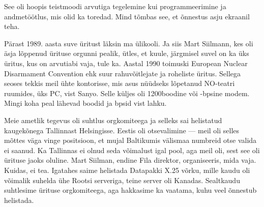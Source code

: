 
See oli hoopis teistmoodi arvutiga 
tegelemine kui programmeerimine ja andmetöötlus, mis olid ka toredad. 
Mind tõmbas see, et õnnestus asju ekraanil teha. 

Pärast 1989. aasta suve üritust läksin ma ülikooli. Ja siis 
Mart Siilmann, kes oli äsja lõppenud ürituse orgunni 
pealik, ütles, et kuule, järgmisel suvel on ka üks üritus, kus on 
arvutiabi vaja, tule ka. Aastal 1990 toimuski European Nuclear Disarmament Convention ehk suur rahuvõitlejate ja roheliste üritus. 
Sellega seoses tekkis meil ühte kontorisse, mis asus nüüdseks 
lõpetanud NO-teatri ruumides, üks PC, vist Sanyo. Selle küljes oli 1200boodine või -bpsine 
modem. Mingi koha peal lähevad boodid ja bpsid vist lahku. 

Meie ametlik tegevus oli suhtlus orgkomiteega ja selleks 
sai helistatud kaugekõnega Tallinnast Helsingisse. Eestis oli otsevalimine --- 
meil oli selles mõttes väga vinge positsioon, et mujal Baltikumis välismaa 
numbreid otse valida ei saanud. Ka Tallinnas ei olnud seda võimalust igal pool, aga meil oli, sest see 
oli ürituse jaoks oluline. Mart Siilman, endine Fila direktor, organiseeris, mida vaja. Kuidas, ei tea. 
Igatahes saime helistada Datapakki X.25 võrku, mille kaudu oli võimalik 
suhelda ühe Rootsi serveriga, teine server oli Kanadas. Sealtkaudu 
suhtlesime ürituse orgkomiteega, aga hakkasime ka vaatama, kuhu veel 
õnnestub helistada.


